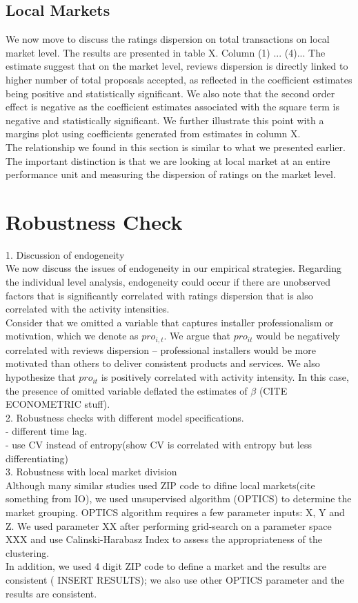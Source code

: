 \documentclass[msom,blindrev]{informs3}
\begin{document}
\subsection{Local Markets}
We now move to discuss the ratings dispersion on total transactions on local market level. The results are presented in table X. Column (1) ... (4)... The estimate suggest that on the market level, reviews dispersion is directly linked to higher number of total proposals accepted, as reflected in the coefficient estimates being positive and statistically significant. We also note that the second order effect is negative as the coefficient estimates associated with the square term is negative and statistically significant. We further illustrate this point with a margins plot using coefficients generated from estimates in column X. \\
The relationship we found in this section is similar to what we presented earlier. The important distinction is that we are looking at local market at an entire performance unit and measuring the dispersion of ratings on the market level.  
\section{Robustness Check}
1. Discussion of endogeneity \\
We now discuss the issues of endogeneity in our empirical strategies. Regarding the individual level analysis, endogeneity could occur if there are unobserved factors that is significantly correlated with ratings dispersion that is also correlated with the activity intensities.\\
Consider that we omitted a variable that captures installer professionalism or motivation, which we denote as $pro_{i,t}$. We argue that $pro_{it}$ would be negatively correlated with reviews dispersion -- professional installers would be more motivated than others to deliver consistent products and services. We also hypothesize that  $pro_{it}$ is positively correlated with activity intensity. In this case, the presence of omitted variable deflated the estimates of $\beta$ (CITE ECONOMETRIC stuff). \\
2. Robustness checks with different model specifications.  \\
- different time lag.  \\
- use CV instead of entropy(show CV is correlated with entropy but less differentiating) \\ 

3. Robustness with local market division\\
Although many similar studies used ZIP code to difine local markets(cite something from IO), we used unsupervised algorithm (OPTICS) to determine the market grouping. OPTICS algorithm requires a few parameter inputs: X, Y and Z. We used parameter XX after performing grid-search on a parameter space XXX and use Calinski-Harabasz Index to assess the appropriateness of the clustering.  \\ In addition, we used 4 digit ZIP code to define a market and the results are consistent ( INSERT RESULTS); we also use other OPTICS parameter and the results are consistent.  \\
\end{document}
